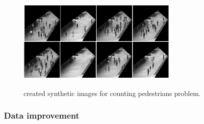 \begin{enumerate}
\begin{figure}[H]
	\centering
	{\includegraphics[width=0.7\textwidth]{images/myped}}
	\caption{created synthetic images for counting pedestrians problem.}
	\label{fig:myped}
\end{figure}

\end{enumerate}

\subsubsection{Data improvement}

